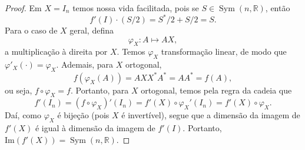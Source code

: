 \documentclass[12pt,a4paper]{article}
\DeclareMathOperator{\Sym}{Sym}
\newcommand{\R}{\mathbb{R}}
\renewcommand{\Im}{\mathrm{Im}}
\begin{document}
\begin{proof}
        Em $X = I_n$ temos nossa vida facilitada, pois se $S\in\Sym(n,\R)$, então
        \begin{equation*}
            f'(I)\cdot (S/2) = S^*/2 + S/2 = S.
        \end{equation*}
        Para o caso de $X$ geral, defina
        \begin{equation*}
            \varphi_X: A\mapsto AX,
        \end{equation*}
        a multiplicação à direita por $X$. Temos $\varphi_X$ transformação linear, de modo que
        $\varphi'_X(\cdot) = \varphi_X$. Ademais, para $X$ ortogonal,
        \begin{equation*}
            f(\varphi_X(A)) = AXX^*A^* = AA^* = f(A),
        \end{equation*}
        ou seja, $f\circ\varphi_X = f$. Portanto, para $X$ ortogonal, temos pela regra da cadeia que
        \begin{equation*}
            f'(I_n) = (f\circ\varphi_X)'(I_n) = f'(X)\circ\varphi_X'(I_n) = f'(X)\circ\varphi_X.
        \end{equation*}
        Daí, como $\varphi_X$ é bijeção (pois $X$ é invertível), segue que a dimensão da imagem de $f'(X)$ 
        é igual à dimensão da imagem de $f'(I)$. Portanto, $\Im(f'(X)) = \Sym(n,\R)$.
    \end{proof}
\end{document}
